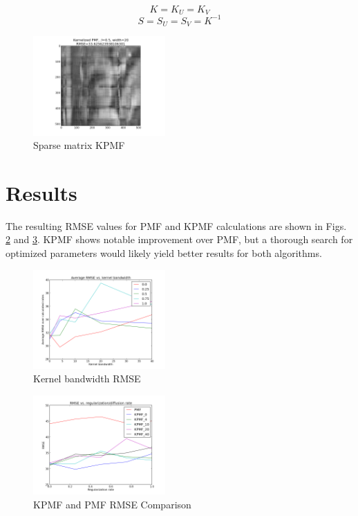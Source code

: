 \documentclass[journal]{IEEEtran}
\begin{document}
\begin{equation}
K = K_U = K_V
\end{equation}
\begin{equation}
S = S_U = S_V = K^{-1}
\end{equation}
\begin{figure}[h!]
\centering
    \includegraphics[width=0.45\textwidth]{sparsekpmf.png}
    \caption{Sparse matrix KPMF}
    \label{fig:sparsekpmf}
\end{figure}

\section{Results}
The resulting RMSE values for PMF and KPMF calculations are shown in Figs. \ref{fig:kernelrmse} and \ref{fig:regdiffrmse}. KPMF shows notable improvement over
PMF, but a thorough search for optimized parameters would likely yield better results for both algorithms.
\begin{figure}[h!]
\centering
    \includegraphics[width=0.45\textwidth]{kernelrmse.png}
    \caption{Kernel bandwidth RMSE}
    \label{fig:kernelrmse}
\end{figure}
\begin{figure}[h!]
\centering
    \includegraphics[width=0.45\textwidth]{regdiffrmse.png}
    \caption{KPMF and PMF RMSE Comparison}
    \label{fig:regdiffrmse}
\end{figure}
\end{document}
